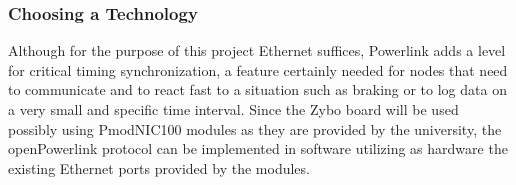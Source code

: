 \subsubsection{Choosing a Technology}
Although for the purpose of this project Ethernet suffices, Powerlink adds a level for critical timing synchronization, a feature certainly needed for nodes that need to communicate and to react fast to a situation such as braking or to log data on a very small and specific time interval. Since the Zybo board will be used possibly using PmodNIC100 modules as they are provided by the university, the openPowerlink protocol can be implemented in software utilizing as hardware the existing Ethernet ports provided by the modules.





